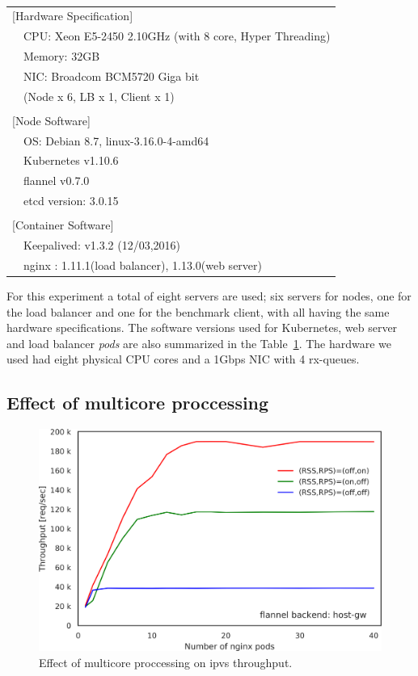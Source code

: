 \begin{table}[]
  \centering
  \begin{tabular}{ll}
    \hline 
    \multicolumn{2}{l}{[Hardware Specification]}   \\
    & CPU: Xeon E5-2450 2.10GHz (with 8 core, Hyper Threading) \\
    & Memory: 32GB \\
    & NIC: Broadcom BCM5720 Giga bit \\
    & (Node x 6, LB x 1, Client x 1) \\
    & \\
    \multicolumn{2}{l}{[Node Software]}  \\
    & OS: Debian 8.7, linux-3.16.0-4-amd64 \\
    & Kubernetes v1.10.6 \\
    & flannel v0.7.0 \\
    & etcd version: 3.0.15 \\
    & \\
    \multicolumn{2}{l}{[Container Software]}   \\
    & Keepalived: v1.3.2 (12/03,2016) \\
    & nginx : 1.11.1(load balancer), 1.13.0(web server) \\
    \hline
  \end{tabular}
  \caption{}
  \label{tab:hw_sw_spec}
\end{table}

For this experiment a total of eight servers are used; six servers for nodes, one for the load balancer and one for the benchmark client, with all having the same hardware specifications.
The software versions used for Kubernetes, web server and load balancer {\em pods} are also summarized in the Table~\ref{tab:hw_sw_spec}.
The hardware we used had eight physical CPU cores and a 1Gbps NIC with 4 rx-queues.

\subsection{Effect of multicore proccessing}

\begin{figure}
  \centering
  \includegraphics[width=0.8\columnwidth]{Figs/ipvs_mcore_proccessing}
  \caption{Effect of multicore proccessing on ipvs throughput.}
  \label{fig:ipvs_mcore_proccessing}
\end{figure}

